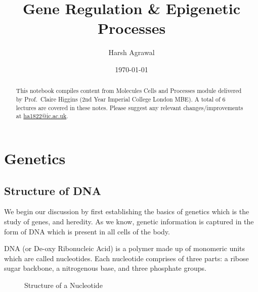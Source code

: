 \documentclass[letterpaper,12pt]{article}
\begin{document}
\title{Gene Regulation \& Epigenetic Processes}
\author{Harsh Agrawal}
\date{\today}
\maketitle

\begin{abstract}
	This notebook compiles content from Molecules Cells and Processes module delivered by Prof.\ Claire Higgins (2nd Year Imperial College London MBE). A total of 6 lectures are covered in these notes. Please suggest any relevant changes/improvements at \href{ha1822@ic.ac.uk}{ha1822@ic.ac.uk}.
\end{abstract}

\tableofcontents
\newpage
\section{Genetics}
\subsection{Structure of DNA}
We begin our discussion by first establishing the basics of genetics which is the study of genes, and heredity. As we know, genetic information is captured in the form of DNA which is present in all cells of the body.

DNA (or De-oxy Ribonucleic Acid) is a polymer made up of monomeric units which are called nucleotides. Each nucleotide comprises of three parts: a ribose sugar backbone, a nitrogenous base, and three phosphate groups.\ \vspace{.5cm}

\begin{figure}[!h]
	\centering
	\caption{Structure of a Nucleotide}
\end{figure}
\end{document}
